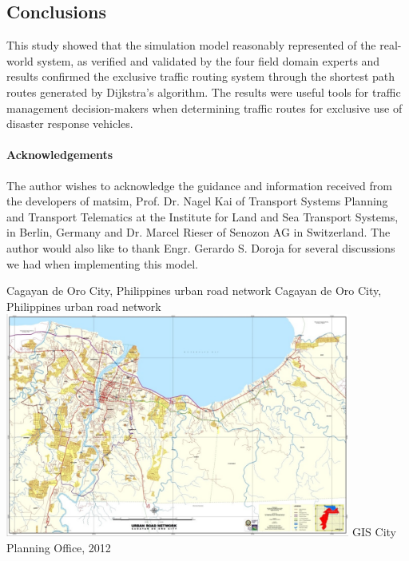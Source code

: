 \subsection{Conclusions}
This study showed that the simulation model reasonably represented of the real-world system, as verified and validated by the four field domain experts and results confirmed the exclusive traffic routing system through the shortest path routes generated by Dijkstra’s algorithm. The results were useful tools for traffic management decision-makers when determining traffic routes for exclusive use of disaster response vehicles.

\paragraph{Acknowledgements}
The author wishes to acknowledge the guidance and information received from the developers of \gls{matsim}, Prof. Dr. Nagel Kai of Transport Systems Planning and Transport Telematics at the Institute for Land and Sea Transport Systems, in Berlin, Germany and Dr. Marcel Rieser of Senozon AG in Switzerland. The author would also like to thank Engr. Gerardo S. Doroja for several discussions we had when implementing this model.

\createfigure%
{Cagayan de Oro City, Philippines urban road network}%
{Cagayan de Oro City, Philippines urban road network}%
{\label{fig:philippines_fig1}}%
{\includegraphics[width=0.85\textwidth, angle=0]{./using/figures/philippines_fig1.png}}%
{GIS City Planning Office, 2012}

